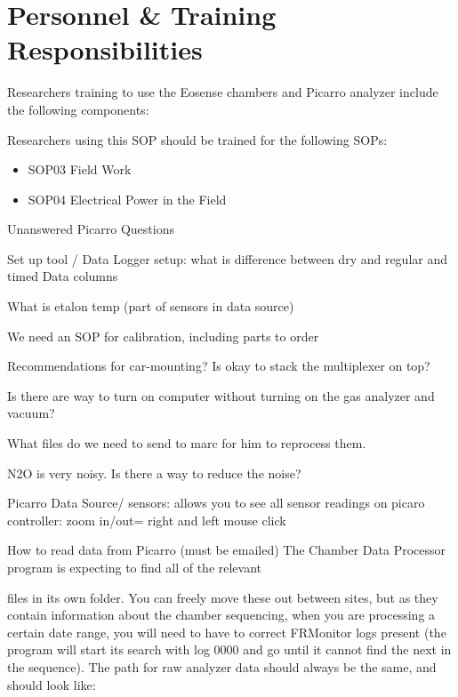 \documentclass[12pt]{../SOP3_alpha}
\begin{document}
\section{Personnel \& Training Responsibilities}

Researchers training to use the Eosense chambers and Picarro analyzer include the following components: 



Researchers using this SOP should be trained for the following SOPs:

\begin{itemize}
  \item SOP03 Field Work
  \item SOP04 Electrical Power in the Field
\end{itemize}



Unanswered Picarro Questions

\NP Set up tool / Data Logger setup: what is difference between dry and regular and timed Data columns

\NP What is etalon temp (part of sensors in data source)

\NP We need an SOP for calibration, including parts to order

\NP Recommendations for car-mounting? Is okay to stack the multiplexer on top?

\NP Is there are way to turn on computer without turning on the gas analyzer and vacuum? 

\NP What files do we need to send to marc for him to reprocess them.

\NP N2O is very noisy. Is there a way to reduce the noise?

Picarro
Data Source/ sensors: allows you to see all sensor readings on picaro
controller: zoom in/out= right and left mouse click

How to read data from Picarro (must be emailed)
The Chamber Data Processor program is expecting to find all of the relevant 

files in its own folder. You can freely move these out between sites, but as they contain information about the chamber sequencing, when you are processing a certain date range, you will need to have to correct FRMonitor logs present (the program will start its search with log 0000 and go until it cannot find the next in the sequence). 
The path for raw analyzer data should always be the same, and should look like:  
\end{document}
